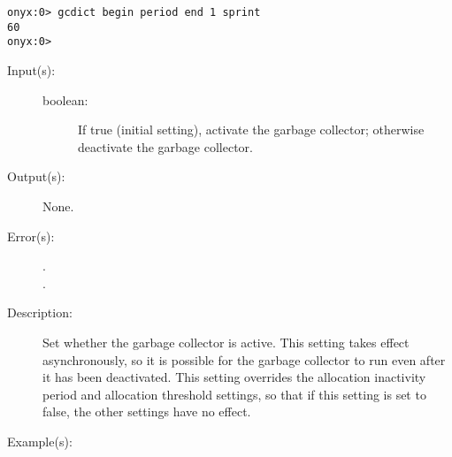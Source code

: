 \begin{description}
\begin{description}
\begin{verbatim}
onyx:0> gcdict begin period end 1 sprint
60
onyx:0>
		\end{verbatim}
	\end{description}
\label{gcdict:setactive}
\item[{\onyxop{boolean}{setactive}{--}}: ]
	\begin{description}\item[]
	\item[Input(s): ]
		\begin{description}\item[]
		\item[boolean: ]
			If true (initial setting), activate the garbage
			collector; otherwise deactivate the garbage collector.
		\end{description}
	\item[Output(s): ] None.
	\item[Error(s): ]
		\begin{description}\item[]
		\item[.]
		\item[.]
		\end{description}
	\item[Description: ]
		Set whether the garbage collector is active.  This setting takes
		effect asynchronously, so it is possible for the garbage
		collector to run even after it has been deactivated.  This
		setting overrides the allocation inactivity period and
		allocation threshold settings, so that if this setting is set to
		false, the other settings have no effect.
	\item[Example(s): ]\begin{verbatim}


\end{verbatim}
\end{description}
\end{description}

